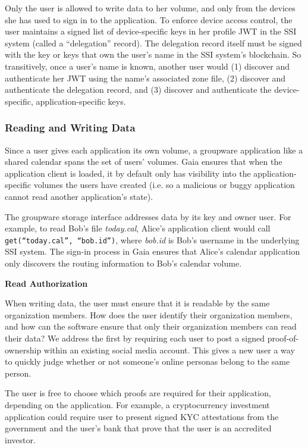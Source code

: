 Only the user is allowed to write data to her volume, and only from the devices
she has used to sign in to the application.  To enforce device access control,
the user maintains a signed list of device-specific keys in her profile JWT in
the SSI system (called a ``delegation'' record).  The delegation record itself
must be signed with the key or keys that own the user's name in the SSI system's
blockchain.  So transitively, once a user's name is known, another user would
(1) discover and authenticate her JWT using the name's associated zone file, 
(2) discover and authenticate the delegation record, and (3) discover and
authenticate the device-specific, application-specific keys.

\subsubsection{Reading and Writing Data}

Since a user gives each application its own volume, a groupware application like
a shared calendar spans the set of users' volumes.  Gaia ensures that when the
application client is loaded, it by default only has visibility into the
application-specific volumes the users have created (i.e. so a malicious
or buggy application cannot read another application's state).

The groupware storage interface addresses data by its key and owner user.  For
example, to read Bob's file \textit{today.cal}, Alice's application client would call
\texttt{get(``today.cal'', ``bob.id'')}, where \textit{bob.id} is Bob's username
in the underlying SSI system.  The sign-in process in Gaia
ensures that Alice's calendar application only discovers the routing information 
to Bob's calendar volume.

\textbf{Read Authorization}

When writing data, the user must ensure that it is readable by the same
organization members.  How does the user identify their organization members,
and how can the software ensure that only their organization members can read
their data?  We address the first by requiring each user to post a signed
proof-of-ownership within an existing social media account.  This gives a new
user a way to quickly judge whether or not someone's online personas belong to
the same person.

The user is free to choose which proofs are required for their
application, depending on the application.  For example, a cryptocurrency
investment application could require user to present signed KYC attestations
from the government and the user's bank that prove that the user is an
accredited investor.

